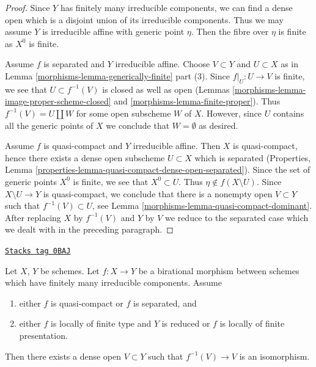 \begin{proof}

Since $Y$ has finitely many irreducible components, we can find a dense
open which is a disjoint union of its irreducible components. Thus we may
assume $Y$ is irreducible affine with generic point $\eta$. Then the fibre
over $\eta$ is finite as $X^0$ is finite.

\medskip\noindent
Assume $f$ is separated and $Y$ irreducible affine. Choose $V \subset Y$
and $U \subset X$ as in Lemma \ref{morphisms-lemma-generically-finite} part (3).
Since $f|_U : U \to V$ is finite, we see that $U \subset f^{-1}(V)$
is closed as well as open (Lemmas \ref{morphisms-lemma-image-proper-scheme-closed} and
\ref{morphisms-lemma-finite-proper}). Thus $f^{-1}(V) = U \amalg W$ for some
open subscheme $W$ of $X$. However, since $U$ contains all the generic
points of $X$ we conclude that $W = \emptyset$ as desired.

\medskip\noindent
Assume $f$ is quasi-compact and $Y$ irreducible affine. Then $X$ is
quasi-compact, hence there exists a dense open subscheme $U \subset X$
which is separated
(Properties, Lemma \ref{properties-lemma-quasi-compact-dense-open-separated}).
Since the set of generic points $X^0$ is finite, we see that $X^0 \subset U$.
Thus $\eta \not \in f(X \setminus U)$. Since $X \setminus U \to Y$ is
quasi-compact, we conclude that there is a nonempty open $V \subset Y$
such that $f^{-1}(V) \subset U$, see Lemma \ref{morphisms-lemma-quasi-compact-dominant}.
After replacing $X$ by $f^{-1}(V)$ and $Y$ by $V$ we reduce to the
separated case which we dealt with in the preceding paragraph.
\end{proof}

\begin{lemma}
\label{morphisms-lemma-birational-isomorphism-over-dense-open}
\href{https://stacks.math.columbia.edu/tag/0BAJ}{\texttt{Stacks tag 0BAJ}}

Let $X$, $Y$ be schemes. Let $f : X \to Y$ be a birational morphism
between schemes which have finitely many irreducible components.
Assume
\begin{enumerate}
\item either $f$ is quasi-compact or $f$ is separated, and
\item either $f$ is locally of finite type and $Y$ is reduced or
$f$ is locally of finite presentation.
\end{enumerate}
Then there exists a dense open $V \subset Y$
such that $f^{-1}(V) \to V$ is an isomorphism.
\end{lemma}

